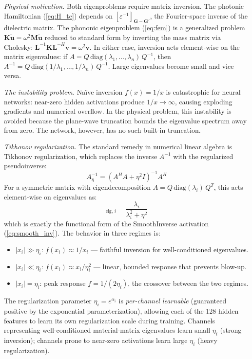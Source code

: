 \documentclass[11pt]{article}
\begin{document}
\textit{Physical motivation.} Both eigenproblems require matrix inversion. The photonic Hamiltonian (\cref{eq:H_te}) depends on $[\varepsilon^{-1}]_{\mathbf{G}-\mathbf{G}'}$, the Fourier-space inverse of the dielectric matrix. The phononic eigenproblem (\cref{eq:fem}) is a generalized problem $\mathbf{K}\tilde{\mathbf{u}} = \omega^2 \mathbf{M}\tilde{\mathbf{u}}$ reduced to standard form by inverting the mass matrix via Cholesky: $\mathbf{L}^{-1}\mathbf{K}\mathbf{L}^{-H}\mathbf{v} = \omega^2\mathbf{v}$. In either case, inversion acts element-wise on the matrix eigenvalues: if $A = Q\,\text{diag}(\lambda_1, \ldots, \lambda_n)\,Q^{-1}$, then $A^{-1} = Q\,\text{diag}(1/\lambda_1, \ldots, 1/\lambda_n)\,Q^{-1}$. Large eigenvalues become small and vice versa.

\textit{The instability problem.} Na\"ive inversion $f(x) = 1/x$ is catastrophic for neural networks: near-zero hidden activations produce $1/x \to \infty$, causing exploding gradients and numerical overflow. In the physical problem, this instability is avoided because the plane-wave truncation bounds the eigenvalue spectrum away from zero. The network, however, has no such built-in truncation.

\textit{Tikhonov regularization.} The standard remedy in numerical linear algebra is Tikhonov regularization, which replaces the inverse $A^{-1}$ with the regularized pseudoinverse:
\begin{equation}
    A^{-1}_\eta = (A^H A + \eta^2 I)^{-1} A^H
\end{equation}
For a symmetric matrix with eigendecomposition $A = Q\,\text{diag}(\lambda_i)\,Q^T$, this acts element-wise on eigenvalues as:
\begin{equation}
    [A^{-1}_\eta]_{\text{eig},\,i} = \frac{\lambda_i}{\lambda_i^2 + \eta^2}
    \label{eq:tikhonov_eig}
\end{equation}
which is exactly the functional form of the SmoothInverse activation (\cref{eq:smooth_inv}). The behavior in three regimes is:
\begin{itemize}
    \item $|x_i| \gg \eta_i$: $f(x_i) \approx 1/x_i$ --- faithful inversion for well-conditioned eigenvalues.
    \item $|x_i| \ll \eta_i$: $f(x_i) \approx x_i/\eta_i^2$ --- linear, bounded response that prevents blow-up.
    \item $|x_i| = \eta_i$: peak response $f = 1/(2\eta_i)$, the crossover between the two regimes.
\end{itemize}
The regularization parameter $\eta_i = e^{\alpha_i}$ is \emph{per-channel learnable} (guaranteed positive by the exponential parameterization), allowing each of the 128 hidden features to learn its own regularization scale during training. Channels representing well-conditioned material-matrix eigenvalues learn small $\eta_i$ (strong inversion); channels prone to near-zero activations learn large $\eta_i$ (heavy regularization).
\end{document}
